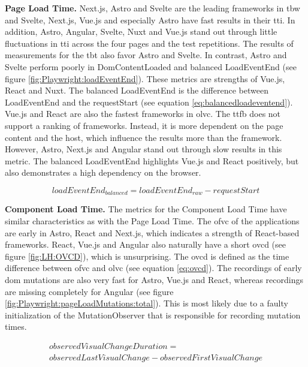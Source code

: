 \documentclass[a4paper, 12pt]{article}
\begin{document}
\textbf{Page Load Time.} Next.js, Astro and Svelte are the leading frameworks in \acrshort{tbw} and Svelte, Next.js, Vue.js and especially Astro have fast results in their \acrshort{tti}.
In addition, Astro, Angular, Svelte, Nuxt and Vue.js stand out through little fluctuations in \acrshort{tti} across the four pages and the test repetitions.
The results of measurements for the \acrshort{tbt} also favor Astro and Svelte.
In contrast, Astro and Svelte perform poorly in DomContentLoaded and balanced LoadEventEnd (see figure \ref{fig:Playwright:loadEventEnd}).
These metrics are strengths of Vue.js, React and Nuxt.
The balanced LoadEventEnd is the difference between LoadEventEnd and the requestStart (see equation \ref{eq:balancedloadeventend}).
Vue.js and React are also the fastest frameworks in \acrshort{olvc}.
The \acrshort{ttfb} does not support a ranking of frameworks.
Instead, it is more dependent on the page content and the host, which influence the results more than the framework.
However, Astro, Next.js and Angular stand out through slow results in this metric.
The balanced LoadEventEnd highlights Vue.js and React positively, but also demonstrates a high dependency on the browser.

\vspace{-0.3cm}
\begin{equation}\label{eq:balancedloadeventend}
\mathit{loadEventEnd}_\mathit{balanced} = \mathit{loadEventEnd}_\mathit{raw} - \mathit{requestStart}
\end{equation}
\vspace{-0.2cm}

\textbf{Component Load Time.} The metrics for the Component Load Time have similar characteristics as with the Page Load Time.
The \acrshort{ofvc} of the applications are early in Astro, React and Next.js, which indicates a strength of React-based frameworks.
React, Vue.js and Angular also naturally have a short \acrfull{ovcd} (see figure \ref{fig:LH:OVCD}), which is unsurprising.
The \acrshort{ovcd} is defined as the time difference between \acrshort{ofvc} and \acrshort{olvc} (see equation \ref{eq:ovcd}).
The recordings of early \acrshort{dom} mutations are also very fast for Astro, Vue.js and React, whereas recordings are missing completely for Angular (see figure \ref{fig:Playwright:pageLoadMutations:total}).
This is most likely due to a faulty initialization of the MutationObserver that is responsible for recording mutation times.

\vspace{-0.8cm}
\begin{multline}\label{eq:ovcd}
  \mathit{observedVisualChangeDuration} =\\ \mathit{observedLastVisualChange} - \mathit{observedFirstVisualChange}
\end{multline}
\vfill
\end{document}
